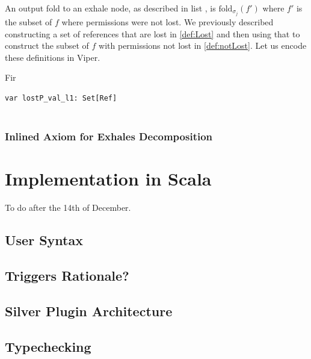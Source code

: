 \documentclass[msc,oneside]{ubcthesis}
\theoremstyle{definition}
\begin{document}
An output fold to an exhale node, as described in list , is $\textrm{fold}_{\sigma_j}(f')$ where $f'$ is the subset of $f$ where permissions were not lost. We previously described constructing a set of references that are lost in \cref{def:Lost} and then using that to construct the subset of $f$ with permissions not lost in \cref{def:notLost}. Let us encode these definitions in Viper.

Fir

\begin{lstlisting}
var lostP_val_l1: Set[Ref]


\end{lstlisting}




\subsection{Inlined Axiom for Exhales Decomposition}










\chapter{Implementation in Scala}
To do after the 14th of December. 
\section{User Syntax}

\section{Triggers Rationale?}

\section{Silver Plugin Architecture}

\section{Typechecking}
\end{document}
